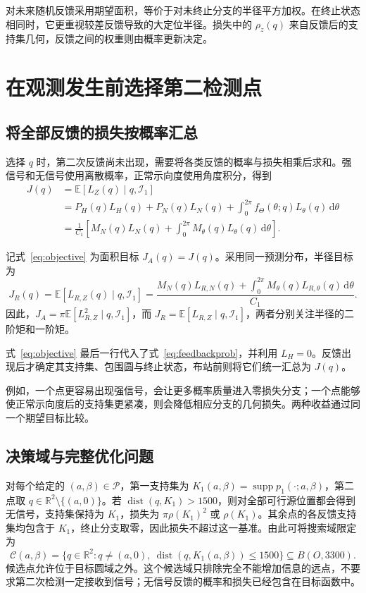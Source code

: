 \documentclass[UTF8,a4paper,zihao=-4,fontset=none]{ctexart}
\numberwithin{equation}{section}
\newcommand{\dd}{\,\mathrm d}
\newcommand{\E}{\mathbb E}
\newcommand{\supp}{\operatorname{supp}}
\newcommand{\dist}{\operatorname{dist}}
\begin{document}
对未来随机反馈采用期望面积，等价于对未终止分支的半径平方加权。在终止状态相同时，它更重视较差反馈导致的大定位半径。损失中的 \(\rho_z(q)\) 来自反馈后的支持集几何，反馈之间的权重则由概率更新决定。

\section{在观测发生前选择第二检测点}
\subsection{将全部反馈的损失按概率汇总}
选择 \(q\) 时，第二次反馈尚未出现，需要将各类反馈的概率与损失相乘后求和。强信号和无信号使用离散概率，正常示向度使用角度积分，得到
\begin{equation}\label{eq:objective}
\begin{aligned}
J(q)&=\E[L_Z(q)\mid q,\mathcal I_1]\\
&=P_H(q)L_H(q)+P_N(q)L_N(q)
 +\int_0^{2\pi}f_\Theta(\theta;q)L_\theta(q)\dd\theta\\
&=\frac{1}{C_1}\left[M_N(q)L_N(q)
 +\int_0^{2\pi}M_\theta(q)L_\theta(q)\dd\theta\right].
\end{aligned}
\end{equation}

记式~\eqref{eq:objective} 为面积目标 \(J_A(q)=J(q)\)。采用同一预测分布，半径目标为
\begin{equation}\label{eq:radius-objective}
J_R(q)=\E[L_{R,Z}(q)\mid q,\mathcal I_1]
=\frac{M_N(q)L_{R,N}(q)+\int_0^{2\pi}M_\theta(q)L_{R,\theta}(q)\dd\theta}{C_1}.
\end{equation}
因此，\(J_A=\pi\E[L_{R,Z}^2\mid q,\mathcal I_1]\)，而 \(J_R=\E[L_{R,Z}\mid q,\mathcal I_1]\)，两者分别关注半径的二阶矩和一阶矩。

式~\eqref{eq:objective} 最后一行代入了式~\eqref{eq:feedbackprob}，并利用 \(L_H=0\)。反馈出现后才确定其支持集、包围圆与终止状态，布站前则将它们统一汇总为 \(J(q)\)。

例如，一个点更容易出现强信号，会让更多概率质量进入零损失分支；一个点能够使正常示向度后的支持集更紧凑，则会降低相应分支的几何损失。两种收益通过同一个期望目标比较。

\subsection{决策域与完整优化问题}
对每个给定的 \((a,\beta)\in\mathcal P\)，第一支持集为 \(K_1(a,\beta)=\supp p_1(\cdot;a,\beta)\)，第二点取 \(q\in\mathbb R^2\setminus\{(a,0)\}\)。若 \(\dist(q,K_1)>1500\)，则对全部可行源位置都会得到无信号，支持集保持为 \(K_1\)，损失为 \(\pi\rho(K_1)^2\) 或 \(\rho(K_1)\)。其余点的各反馈支持集均包含于 \(K_1\)，终止分支取零，因此损失不超过这一基准。由此可将搜索域限定为
\begin{equation}\label{eq:candidate-domain}
\mathcal C(a,\beta)=\{q\in\mathbb R^2:q\ne(a,0),\ \dist(q,K_1(a,\beta))\le1500\}\subseteq B(O,3300).
\end{equation}
候选点允许位于目标圆域之外。这个候选域只排除完全不能增加信息的远点，不要求第二次检测一定接收到信号；无信号反馈的概率和损失已经包含在目标函数中。
\end{document}
